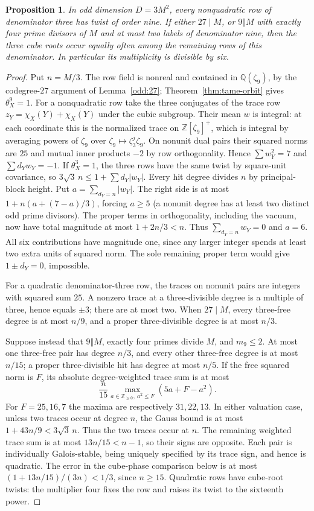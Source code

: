 \documentclass[11pt]{amsart}
\numberwithin{equation}{section}
\newtheorem{proposition}[theorem]{Proposition}
\theoremstyle{definition}
\theoremstyle{plain}
\newcommand{\QQ}{\mathbb Q}
\newcommand{\ZZ}{\mathbb Z}
\begin{document}
\begin{proposition}\label{odd:ternary-multiplicity}
In odd dimension $D=3M^2$, every nonquadratic row of denominator
three has twist of order nine. If either $27\mid M$, or $9\Vert M$ with exactly four prime
divisors of $M$ and at most two labels of denominator nine, then the
three cube roots occur equally often among the remaining rows of
this denominator.
In particular its multiplicity is divisible by six.
\end{proposition}
\begin{proof}
Put $n=M/3$. The row field is nonreal and contained in $\QQ(\zeta_9)$,
by the codegree-$27$ argument of Lemma~\ref{odd:27};
Theorem~\ref{thm:tame-orbit} gives $\theta_X^9=1$.
For a nonquadratic row take the three conjugates of the trace row
$z_Y=\chi_X(Y)+\overline{\chi_X(Y)}$ under the cubic subgroup.
Their mean $w$ is integral: at each coordinate this is the normalized
trace on $\ZZ[\zeta_9]^+$, which is integral by averaging powers of
$\zeta_9$ over $\zeta_9\mapsto\zeta_3^j\zeta_9$. On nonunit dual
pairs their squared norms are $25$ and mutual inner products $-2$
by row orthogonality. Hence $\sum w_Y^2=7$ and $\sum d_Yw_Y=-1$.
If $\theta_X^3=1$, the three rows have the same twist by square-unit
covariance, so $3\sqrt3\,n\le1+\sum d_Y|w_Y|$.
Every hit degree divides $n$ by principal-block height. Put
$a=\sum_{d_Y=n}|w_Y|$. The right side is at most
$1+n(a+(7-a)/3)$, forcing $a\ge5$ (a nonunit degree has at least
two distinct odd prime divisors). The proper terms in orthogonality,
including the vacuum, now have total magnitude at most $1+2n/3<n$.
Thus $\sum_{d_Y=n}w_Y=0$ and $a=6$. All six contributions have
magnitude one, since any larger integer spends at least two extra
units of squared norm. The sole remaining proper term would give
$1\pm d_Y=0$, impossible.

For a quadratic denominator-three row, the traces on nonunit pairs
are integers with squared sum $25$. A nonzero trace at a
three-divisible degree is a multiple of three, hence equals
$\pm3$; there are at most two. When $27\mid M$, every
three-free degree is at most $n/9$, and a proper three-divisible
degree is at most $n/3$.

Suppose instead that $9\Vert M$, exactly four primes divide $M$,
and $m_9\le2$. At most one three-free pair has degree $n/3$,
and every other three-free degree is at most $n/15$; a proper
three-divisible hit has degree at most $n/5$. If the free squared
norm is $F$, its absolute degree-weighted trace sum is at most
\[
 \frac n{15}\max_{a\in\ZZ_{\ge0},\ a^2\le F}(5a+F-a^2).
\]
For $F=25,16,7$ the maxima are respectively $31,22,13$.
In either valuation case, unless two traces occur at degree $n$,
the Gauss bound is at most $1+43n/9<3\sqrt3\,n$.
Thus the two traces occur at $n$. The remaining weighted trace
sum is at most $13n/15<n-1$, so their signs are opposite.
Each pair is individually Galois-stable, being uniquely specified
by its trace sign, and hence is quadratic. The error in the cube-phase comparison below is at most
$(1+13n/15)/(3n)<1/3$, since $n\ge15$. Quadratic rows have
cube-root twists: the multiplier four fixes the row and raises
its twist to the sixteenth power.


\end{proof}
\end{document}
